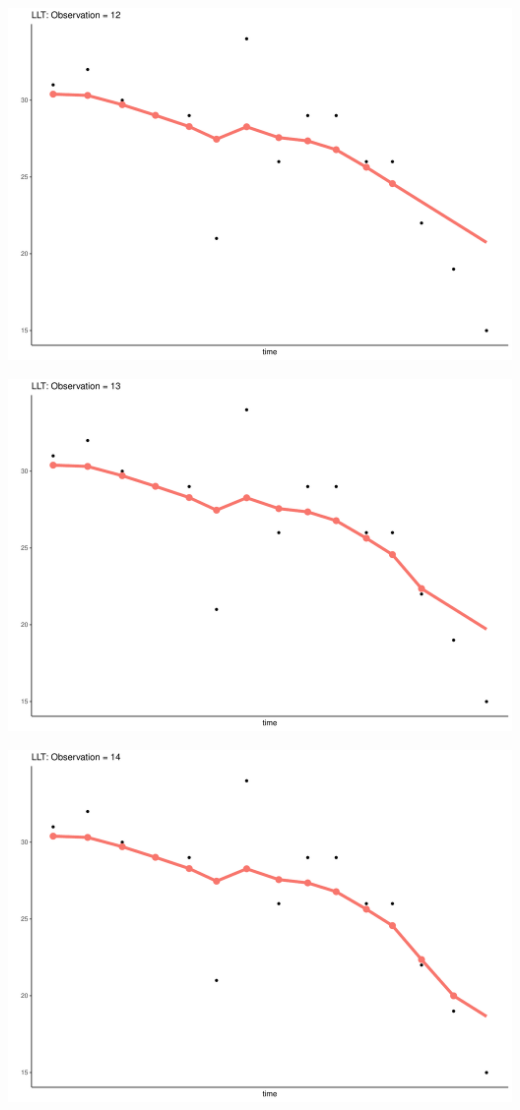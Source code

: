 \documentclass[
  ignorenonframetext,
]{beamer}
\begin{document}
\begin{frame}{}
\protect\hypertarget{section-41}{}
\includegraphics{Prez4_files/figure-beamer/unnamed-chunk-15-12.pdf}
\end{frame}

\begin{frame}{}
\protect\hypertarget{section-42}{}
\includegraphics{Prez4_files/figure-beamer/unnamed-chunk-15-13.pdf}
\end{frame}

\begin{frame}{}
\protect\hypertarget{section-43}{}
\includegraphics{Prez4_files/figure-beamer/unnamed-chunk-15-14.pdf}
\end{frame}
\end{document}
